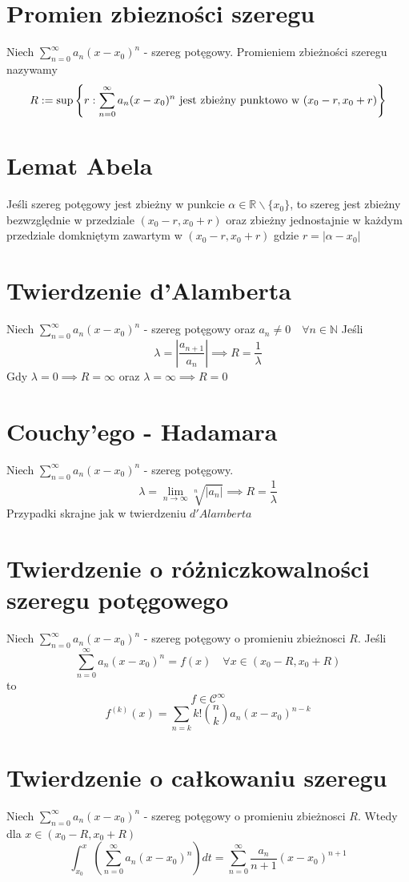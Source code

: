 \documentclass[11pt]{article}
\begin{document}
\section{Promien zbiezności szeregu}
Niech $ \sum_{n = 0}^{\infty}{a_n (x - x_0)^n}$ - szereg potęgowy. Promieniem zbieżności szeregu nazywamy 
$$ R := \sup{ \left\{r : \sum_{n = 0}^{\infty}{a_n (x - x_0)^n} \hbox{ jest zbieżny punktowo w } (x_0 - r, x_0 +r)\right\}}$$

\section{Lemat Abela}
Jeśli szereg potęgowy jest zbieżny w punkcie $ \alpha \in \mathbb{R} \backslash \{ x_0 \}$, to szereg jest zbieżny bezwzględnie w przedziale $(x_0 - r , x_0 + r)$ oraz zbieżny jednostajnie w każdym przedziale domkniętym zawartym w $(x_0 - r, x_0 + r)$ gdzie $r = |\alpha - x_0|$ 

\section{Twierdzenie d'Alamberta}
Niech $ \sum_{n = 0}^{\infty}{a_n (x - x_0)^n}$ - szereg potęgowy oraz $ a_n \not = 0 \quad \forall n \in \mathbb{N}$
Jeśli $$ \lambda = \left| \frac{a_{n+1}}{a_n} \right| \implies R = \frac{1}{\lambda} $$
Gdy $ \lambda = 0 \implies R = \infty$ oraz $ \lambda = \infty \implies R = 0 $

\section{Couchy'ego - Hadamara}
Niech $ \sum_{n = 0}^{\infty}{a_n (x - x_0)^n}$ - szereg potęgowy.
$$ \lambda = \lim_{n \to \infty}{\sqrt[n]{|a_n|}} \implies R = \frac{1}{\lambda} $$
Przypadki skrajne jak w twierdzeniu $d'Alamberta$

\section{Twierdzenie o różniczkowalności szeregu potęgowego}
Niech $ \sum_{n = 0}^{\infty}{a_n (x - x_0)^n}$ - szereg potęgowy o promieniu zbieżnosci $R$.
Jeśli  $$ \sum_{n = 0}^{\infty}{a_n (x - x_0)^n} = f(x) \quad \forall x \in (x_0 - R , x_0 + R) $$ 
to
$$ f \in \mathcal{C}^{\infty}$$
$$ f^{(k)}(x) = \sum_{n = k}{k! {n \choose k} a_n(x-x_0)^{n-k}}$$



\section{Twierdzenie o całkowaniu szeregu}

Niech $ \sum_{n = 0}^{\infty}{a_n (x - x_0)^n}$ - szereg potęgowy o promieniu zbieżnosci $R$. Wtedy dla $x \in (x_0 - R , x_0 + R)$
$$ \int_{x_0}^x ( \sum_{n = 0}^{\infty}{a_n (x - x_0)^n}) dt = \sum_{n = 0}^{\infty}{\frac{a_n}{n+1} (x - x_0)^{n+1}}$$
\end{document}
